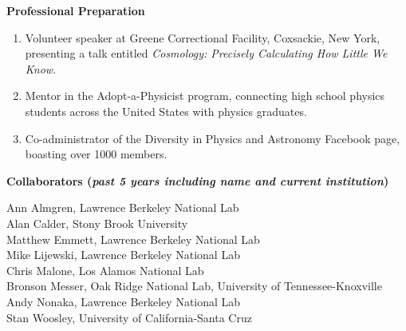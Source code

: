 \documentclass[11pt,letterpaper,english]{article}
\begin{document}
\begin{flushleft} {\bf Professional Preparation}
\begin{enumerate}
\item Volunteer speaker at Greene Correctional Facility, Coxsackie, New York, 
  presenting a talk entitled
  {\em Cosmology: Precisely Calculating How Little We Know}. \\

\item Mentor in the Adopt-a-Physicist program, connecting high school physics 
  students across the United States with physics graduates. \\

\item Co-administrator of the Diversity in Physics and Astronomy Facebook page,
  boasting over 1000 members. \\

\end{enumerate} 

\vspace{-6pt}
{\bf Collaborators ({\emph{past 5 years including name and current institution}})} 
{\parindent 16pt

Ann Almgren, Lawrence Berkeley National Lab\\
Alan Calder, Stony Brook University\\
Matthew Emmett, Lawrence Berkeley National Lab\\
Mike Lijewski, Lawrence Berkeley National Lab\\
Chris Malone, Los Alamos National Lab\\
Bronson Messer, Oak Ridge National Lab, University of Tennessee-Knoxville\\
Andy Nonaka, Lawrence Berkeley National Lab\\
Stan Woosley, University of California-Santa Cruz

}


\end{flushleft}
\end{document}
